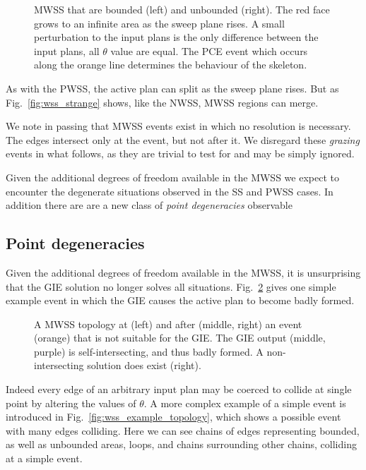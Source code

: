 \begin{figure}
  \centering
  \def\svgwidth{1.0\columnwidth}
  
  \caption[Unbounded MWSS]{\label{fig:wss_unbounded}MWSS that are bounded (left) and unbounded (right). The red face grows to an infinite area as the sweep plane rises. A small perturbation to the input plans is the only difference between the input plans, all $\theta$ value are equal. The PCE event which occurs along the orange line determines the behaviour of the skeleton. }
\end{figure}

As with the PWSS, the active plan can split as the sweep plane rises. But as Fig.~\ref{fig:wss_strange} shows, like the NWSS, MWSS regions can merge.

We note in passing that MWSS events exist in which no resolution is necessary. The edges intersect only at the event, but not after it. We disregard these \emph{grazing} events in what follows, as they are trivial to test for and may be simply ignored.

Given the additional degrees of freedom available in the MWSS we expect to encounter the degenerate situations observed in the SS and PWSS cases. In addition there are are a new class of \emph{point degeneracies} observable

\FloatBarrier
\subsection{Point degeneracies}

Given the additional degrees of freedom available in the MWSS, it is unsurprising that the GIE solution no longer solves all situations. Fig.~\ref{fig:pwss_gie_failure} gives one simple example event in which the GIE causes the active plan to become badly formed.

\begin{figure}
  \centering
  \def\svgwidth{1.0\columnwidth}
  
  \caption[The GIE doesn't work on the PWSS]{\label{fig:pwss_gie_failure}A MWSS topology at (left) and after (middle, right) an event (orange) that is not suitable for the GIE. The GIE output (middle, purple) is self-intersecting, and thus badly formed. A non-intersecting solution does exist (right).}
\end{figure}

Indeed every edge of an arbitrary input plan may be coerced to collide at single point by altering the values of $\theta$. A more complex example of a simple event is introduced in Fig.~\ref{fig:wss_example_topology}, which shows a possible event with many edges colliding. Here we can see chains of edges representing bounded, as well as unbounded areas, loops, and chains surrounding other chains, colliding at a simple event. 

